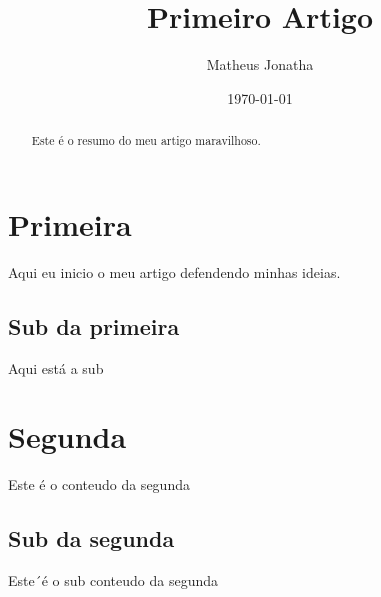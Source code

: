\documentclass[12pt,a4paper]{article}
\author{Matheus Jonatha}
\date{ \today}
\title{Primeiro Artigo}
\begin{document}
\maketitle %

\begin{abstract}
	Este é o resumo do meu artigo maravilhoso.
\end{abstract}

\section{Primeira}
Aqui eu inicio o meu artigo defendendo minhas ideias.
	\subsection{Sub da primeira}
	Aqui está a sub
\section{Segunda}
Este é o conteudo da segunda
	\subsection{Sub da segunda}
	Este´é o sub conteudo da segunda
\end{document}
